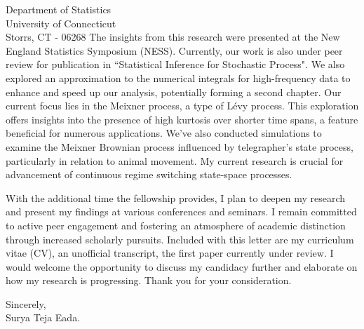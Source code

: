 \documentclass[a4paper,10pt]{letter}
\begin{document}
\begin{letter}{%
Department of Statistics \\
University of Connecticut \\
Storrs, CT - 06268
}
The insights from this research were presented at the New England
Statistics Symposium (NESS).  Currently, our work is also under peer
review for publication in ``Statistical Inference for Stochastic
Process".  We also explored an approximation to the numerical
integrals for high-frequency data to enhance and speed up our
analysis, potentially forming a second chapter. Our current focus lies
in the Meixner process, a type of L\'evy process. This exploration
offers insights into the presence of high kurtosis over shorter time
spans, a feature beneficial for numerous applications. We've also
conducted simulations to examine the Meixner Brownian process
influenced by telegrapher's state process, particularly in relation to
animal movement. My current research is crucial for advancement of
continuous regime switching state-space processes.

With the additional time the fellowship provides, I plan to deepen my
research and present my findings at various conferences and seminars.
I remain committed to active peer engagement and fostering an
atmosphere of academic distinction through increased scholarly
pursuits. Included with this letter are my curriculum vitae (CV), an
unofficial transcript, the first paper currently under review. I would
welcome the opportunity to discuss my candidacy further and elaborate
on how my research is progressing.  Thank you for your consideration.

Sincerely, \\
Surya Teja Eada. \\ 
\end{letter}
\end{document}
